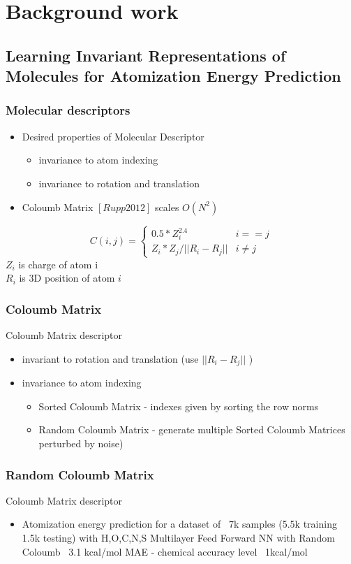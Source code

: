 \documentclass[12pt]{beamer}
\begin{document}
\section{Background work}
\subsection{Learning Invariant Representations of Molecules for Atomization Energy Prediction}
\begin{frame}
   \frametitle{Molecular descriptors}
\begin{itemize}
\item Desired properties of Molecular Descriptor
\begin{itemize}
\item invariance to atom indexing
\item invariance to rotation and translation
\end{itemize}
\item Coloumb Matrix $[Rupp 2012]$ scales $O(N^2)$

\end{itemize}
\begin{equation}
C(i,j) = \left\{
  \begin{array}{lr}
    0.5*Z_i^{2.4} & i== j\\
    Z_i * Z_j / ||R_i - R_j|| & i\neq j
  \end{array}
\right.
\end{equation}
 $Z_i$ is charge of atom i \\$R_i $ is 3D position of atom $i$

\end{frame}

\begin{frame}
\frametitle{Coloumb Matrix}
Coloumb Matrix descriptor
\begin{itemize}
\item invariant to rotation and translation 
(use     $||R_i - R_j||$                 ) 
\item invariance to atom indexing
	\begin{itemize}
\item Sorted Coloumb Matrix - indexes given by sorting the row norms
\item Random Coloumb Matrix - generate multiple  Sorted Coloumb Matrices  perturbed by noise)
\end{itemize}
\end{itemize}
\end{frame}

\begin{frame}
\frametitle{Random Coloumb Matrix}
Coloumb Matrix descriptor
\begin{itemize}
\item Atomization energy prediction for a dataset of ~7k samples (5.5k training 1.5k testing) with {H,O,C,N,S}
 Multilayer Feed Forward NN with Random Coloumb 
~3.1 kcal/mol MAE  - chemical accuracy level ~1kcal/mol
\end{itemize}
\end{frame}
\end{document}
